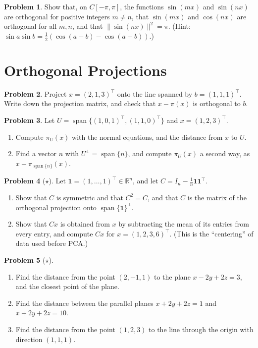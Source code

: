 \documentclass[11pt]{article}
\theoremstyle{definition}
\newtheorem{problem}{Problem}[section]
\newcommand{\norm}[1]{\lVert #1 \rVert}
\DeclareMathOperator{\Span}{span}
\begin{document}
\begin{problem}\label{pr:fourier}
    Show that, on $C[-\pi, \pi]$, the functions $\sin(mx)$ and $\sin(nx)$ are orthogonal for positive integers $m \neq n$, that $\sin(mx)$ and $\cos(nx)$ are orthogonal for all $m, n$, and that $\norm{\sin(nx)}^2 = \pi$. (Hint: $\sin a \sin b = \frac{1}{2}(\cos(a - b) - \cos(a + b))$.)
\end{problem}

\section{Orthogonal Projections}

\begin{problem}\label{pr:proj-line}
    Project $x = (2, 1, 3)^\top$ onto the line spanned by $b = (1, 1, 1)^\top$. Write down the projection matrix, and check that $x - \pi(x)$ is orthogonal to $b$.
\end{problem}

\begin{problem}\label{pr:proj-plane}
    Let $U = \Span\{(1, 0, 1)^\top, (1, 1, 0)^\top\}$ and $x = (1, 2, 3)^\top$.
    \begin{enumerate}[label=(\alph*)]
        \item Compute $\pi_U(x)$ with the normal equations, and the distance from $x$ to $U$.
        \item Find a vector $n$ with $U^\perp = \Span\{n\}$, and compute $\pi_U(x)$ a second way, as $x - \pi_{\Span\{n\}}(x)$.
    \end{enumerate}
\end{problem}

\begin{problem}[$\star$]\label{pr:centering}
    Let $\mathbf{1} = (1, \ldots, 1)^\top \in \mathbb{R}^n$, and let $C = I_n - \frac{1}{n}\mathbf{1}\mathbf{1}^\top$.
    \begin{enumerate}[label=(\alph*)]
        \item Show that $C$ is symmetric and that $C^2 = C$, and that $C$ is the matrix of the orthogonal projection onto $\Span\{\mathbf{1}\}^\perp$.
        \item Show that $Cx$ is obtained from $x$ by subtracting the mean of its entries from every entry, and compute $Cx$ for $x = (1, 2, 3, 6)^\top$. (This is the ``centering'' of data used before PCA.)
    \end{enumerate}
\end{problem}

\begin{problem}[$\star$]\label{pr:distances}
    \begin{enumerate}[label=(\alph*)]
        \item Find the distance from the point $(2, -1, 1)$ to the plane $x - 2y + 2z = 3$, and the closest point of the plane.
        \item Find the distance between the parallel planes $x + 2y + 2z = 1$ and $x + 2y + 2z = 10$.
        \item Find the distance from the point $(1, 2, 3)$ to the line through the origin with direction $(1, 1, 1)$.
    \end{enumerate}
\end{problem}
\end{document}
